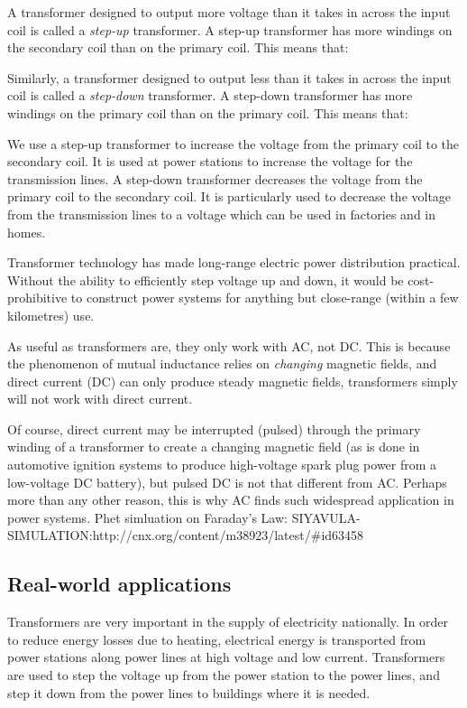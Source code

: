 {A transformer designed to output more voltage than it takes in
across the input coil is called a \textit{step-up} transformer. A
step-up transformer has more windings on the secondary coil than
on the primary coil. This means that: 

Similarly, a transformer designed to output less than it takes in
across the input coil is called a \textit{step-down} transformer.
A step-down transformer has more windings on the primary coil than
on the primary coil. This means that: 

We use a step-up transformer to increase the voltage from the primary coil to the secondary coil. It is used at power stations to increase the voltage for the transmission lines.
A step-down transformer decreases the voltage from the primary coil to the secondary coil. It is particularly used to decrease the voltage from the transmission lines to a voltage which can be used in factories and in homes.

Transformer technology has made long-range electric power
distribution practical. Without the ability to efficiently step
voltage up and down, it would be cost-prohibitive to construct
power systems for anything but close-range (within a few kilometres) use.

As useful as transformers are, they only work with AC,
not DC. This is because the phenomenon of mutual inductance relies on
\textit{changing} magnetic fields, and direct current (DC) can
only produce steady magnetic fields, transformers simply will not
work with direct current.

Of course, direct current may be
interrupted (pulsed) through the primary winding of a transformer
to create a changing magnetic field (as is done in automotive
ignition systems to produce high-voltage spark plug power from a
low-voltage DC battery), but pulsed DC is not that different from
AC. Perhaps more than any other reason, this is why AC finds such
widespread application in power systems.
Phet simluation on Faraday's Law: SIYAVULA-SIMULATION:http://cnx.org/content/m38923/latest/#id63458
\subsection{Real-world applications}
Transformers are very important in the supply of electricity
nationally. In order to reduce energy losses due to heating,
electrical energy is transported from power stations along power
lines at high voltage and low current.  Transformers are used to
step the voltage up from the power station to the power lines, and
step it down from the power lines to buildings where it is needed.



}
